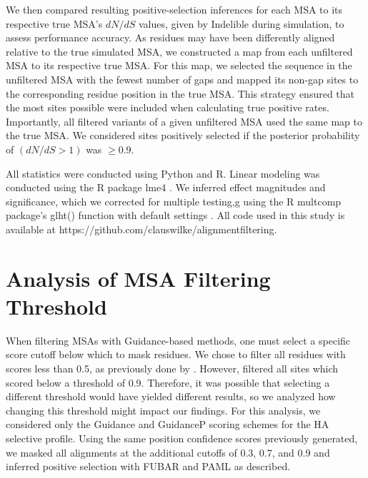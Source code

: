 \documentclass[11pt]{article}
\begin{document}
We then compared resulting positive-selection inferences for each MSA to its respective true MSA's $dN/dS$ values, given by Indelible during simulation, to assess performance accuracy. As residues may have been differently aligned relative to the true simulated MSA, we constructed a map from each unfiltered MSA to its respective true MSA. For this map, we selected the sequence in the unfiltered MSA with the fewest number of gaps and mapped its non-gap sites to the corresponding residue position in the true MSA. This strategy ensured that the most sites possible were included when calculating true positive rates. Importantly, all filtered variants of a given unfiltered MSA used the same map to the true MSA. We considered sites positively selected if the posterior probability of $(dN/dS>1)$ was $\geq0.9$.

All statistics were conducted using Python and R. Linear modeling was conducted using the R package lme4 \citep{Bates2012}. We inferred effect magnitudes and significance, which we corrected for multiple testing,g using the R multcomp package's glht() function with default settings \citep{Hothorn2008}. All code used in this study is available at https://github.com/clauswilke/alignment\underline{\hspace*{0.2cm}}filtering.

\section*{Analysis of MSA Filtering Threshold}
When filtering MSAs with Guidance-based methods, one must select a specific score cutoff below which to mask residues. We chose to filter all residues with scores less than 0.5, as previously done by \citet{Jordan2012}. However, \citet{Privman2012} filtered all sites which scored below a threshold of 0.9. Therefore, it was possible that selecting a different threshold would have yielded different results, so we analyzed how changing this threshold might impact our findings. For this analysis, we considered only the Guidance and GuidanceP scoring schemes for the HA selective profile. Using the same position confidence scores previously generated, we masked all alignments at the additional cutoffs of 0.3, 0.7, and 0.9 and inferred positive selection with FUBAR and PAML as described.
\end{document}

